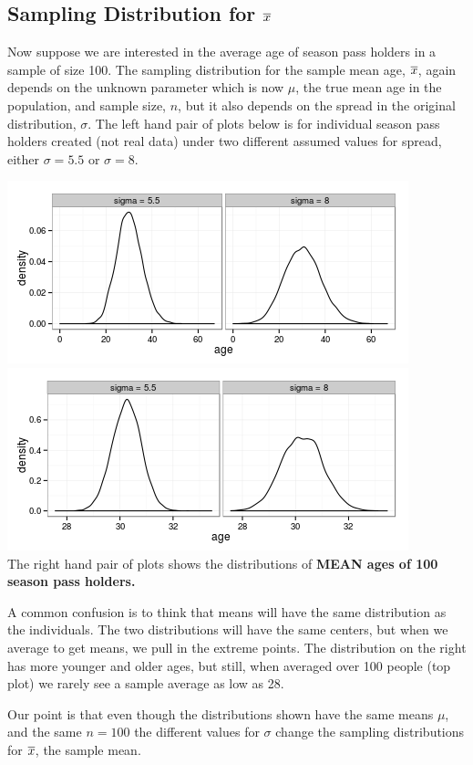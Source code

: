\subsection{ Sampling Distribution for $\overline{x}$}

 Now suppose we are interested in the average age of season pass
 holders in a sample of size 100. The sampling distribution  for the
 sample mean age, $\overline{x}$, 
 again depends on the  unknown parameter which is now $\mu$, the true
 mean age in the population,  and sample size, $n$,
 but it also depends on the spread in the original distribution,
 $\sigma$.  
 The left hand pair of plots below is for individual season pass
 holders created (not real data) under two different assumed values
 for spread, either $\sigma = 5.5$ or $\sigma = 8$.

\includegraphics[width =.48\linewidth]{plots/twoSampDensities4x.png}
\hfill
\includegraphics[width =.48\linewidth]{plots/twoSampDensities4xbar.png}\\

 The right hand pair of plots  shows the distributions of {\bf MEAN ages of 100
   season pass holders.} 

 A common confusion is to think that means will have the same
 distribution as the individuals. The two distributions will have the
 same centers, but when we average to get means, we pull in the
 extreme points.  The distribution on the right has more younger and
 older ages, but still, when averaged over 100 people (top plot) we
 rarely see a sample average as low as 28.

 Our point is that even though the distributions shown have the same
 means $\mu$, and the same $n =  100$ the different values for
 $\sigma$ change the sampling distributions for $\overline{x}$, the sample mean. 



 

